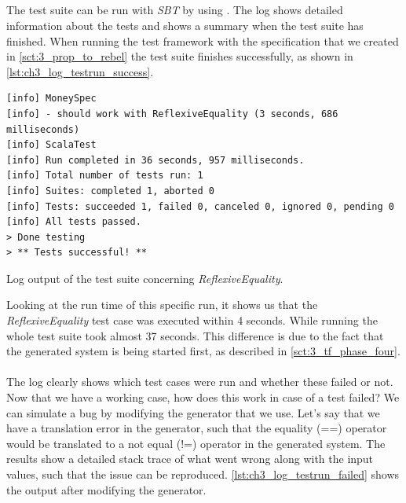 \subsection{\tfPhaseFive{}}
The test suite can be run with \textit{SBT} by using . The log
shows detailed information about the tests and shows a summary when the test
suite has finished. When running the test framework with the specification that
we created in \autoref{sct:3_prop_to_rebel} the test suite finishes
successfully, as shown in \autoref{lst:ch3_log_testrun_success}.
\begin{sourcecode}[!ht]
\begin{lstlisting}[language=Log]
[info] MoneySpec
[info] - should work with ReflexiveEquality (3 seconds, 686 milliseconds)
[info] ScalaTest
[info] Run completed in 36 seconds, 957 milliseconds.
[info] Total number of tests run: 1
[info] Suites: completed 1, aborted 0
[info] Tests: succeeded 1, failed 0, canceled 0, ignored 0, pending 0
[info] All tests passed.
> Done testing
> ** Tests successful! **
\end{lstlisting}
\caption{Log output of the test suite concerning \textit{ReflexiveEquality}.}
\label{lst:ch3_log_testrun_success}
\end{sourcecode}
\FloatBarrier
Looking at the run time of this specific run, it shows us that the
\textit{ReflexiveEquality} test case was executed within 4 seconds. While
running the whole test suite took almost 37 seconds. This difference is due to
the fact that the generated system is being started first, as described in
\autoref{sct:3_tf_phase_four}.\\
\\
The log clearly shows which test cases were run and whether these failed or
not. Now that we have a working case, how does this work in case of a test
failed? We can simulate a bug by modifying the generator that we use. Let's say
that we have a translation error in the generator, such that the equality (==)
operator would be translated to a not equal (!=) operator in the generated
system. The results show a detailed stack trace of what went wrong along with
the input values, such that the issue can be reproduced.
\autoref{lst:ch3_log_testrun_failed} shows the output after modifying the
generator.
